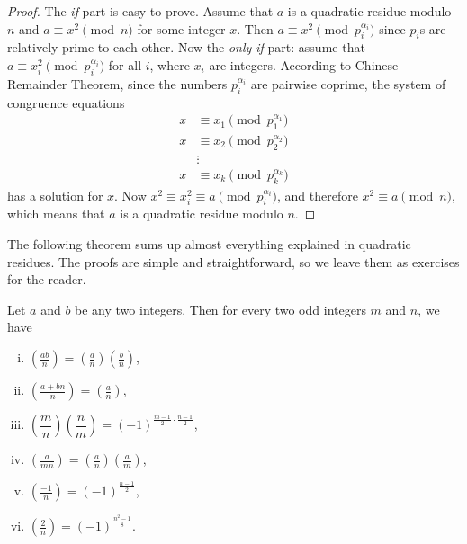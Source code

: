 \documentclass[main.tex]{subfile}
\begin{document}
	\begin{proof}
		The \textit{if} part is easy to prove. Assume that $a$ is a quadratic residue modulo $n$ and $a \equiv x^2 \pmod n$ for some integer $x$. Then $a \equiv x^2 \pmod{p_i^{\alpha_i}}$ since $p_i$s are relatively prime to each other. Now the \textit{only if} part: assume that $a \equiv x_i^2 \pmod{p_i^{\alpha_i}}$ for all $i$, where $x_i$ are integers. According to Chinese Remainder Theorem, since the numbers ${p_i^{\alpha_i}}$ are pairwise coprime, the system of congruence equations
		\begin{align*}
			x & \equiv x_1\pmod{p_1^{\alpha_1}}\\
			x & \equiv x_2\pmod{p_2^{\alpha_2}}\\
			& \vdots\\
			x & \equiv x_k\pmod{p_k^{\alpha_k}}
		\end{align*}
		has a solution for $x$. Now $x^2 \equiv x_i^2 \equiv a \pmod{p_i^{\alpha_i}}$, and therefore $x^2 \equiv a \pmod n$, which means that $a$ is a quadratic residue modulo $n$.
	\end{proof}
	
	The following theorem sums up almost everything explained in quadratic residues. The proofs are simple and straightforward, so we leave them as exercises for the reader.
		\begin{theorem}
			Let $a$ and $b$ be any two integers. Then for every two odd integers $m$ and $n$, we have
			\begin{enumerate}[i.]
				\item $\displaystyle \left(\frac{ab}{n}\right) = \left(\frac{a}{n}\right) \left(\frac{b}{n}\right)$,
				\item $\displaystyle \left(\frac{a+bn}{n}\right) = \left(\frac{a}{n}\right)$,
				\item $\displaystyle \left(\dfrac{m}{n}\right)\left(\dfrac{n}{m}\right)=(-1)^{\frac{m-1}{2}\cdot \frac{n-1}{2}}$,
				\item $\displaystyle \left(\frac{a}{mn}\right) = \left(\frac{a}{n}\right) \left(\frac{a}{m}\right)$,
				\item $\displaystyle \left(\frac{-1}{n}\right) = (-1)^{\frac{n-1}{2}}$,
				\item $\displaystyle \left(\frac{2}{n}\right) = (-1)^{\frac{n^2-1}{8}}$.
			\end{enumerate}
		\end{theorem}
	
\end{document}
